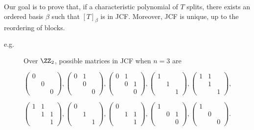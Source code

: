 \documentclass[11pt]{scrartcl}
\begin{document}
Our goal is to prove that, if a characteristic polynomial of $T$ splits, there exists an ordered basis $\beta$ such that $[T]_{\beta}$ is in JCF. Moreover, JCF is unique, up to the reordering of blocks.

\begin{description}

\item[e.g.] Over $\ZZ_2$, possible matrices in JCF when $n=3$ are

  $
  \begin{pmatrix}
    0 &   & \\
      & 0 & \\
      &   & 0
    \end{pmatrix},  \begin{pmatrix}
    0 &1   & \\
      & 0 & \\
      &   & 0
    \end{pmatrix},  \begin{pmatrix}
    0 & 1  & \\
      & 0 &1 \\
      &   & 0
    \end{pmatrix},
      \begin{pmatrix}
    1 &   & \\
      & 1 & \\
      &   & 1
    \end{pmatrix},  \begin{pmatrix}
    1 &1   & \\
      & 1 & \\
      &   & 1
    \end{pmatrix},$

    $  \begin{pmatrix}
    1 & 1  & \\
      & 1 &1 \\
      &   & 1 
    \end{pmatrix},
          \begin{pmatrix}
    0 &   & \\
      & 1 & \\
      &   & 1
    \end{pmatrix},  \begin{pmatrix}
    0 &    & \\
      & 1 & 1 \\
      &   & 1
    \end{pmatrix},
    \begin{pmatrix}
    1 &   & \\
      & 0 &1 \\
      &   & 0 
    \end{pmatrix},
    \begin{pmatrix}
    1 &   & \\
      & 0 & \\
      &   & 0 
    \end{pmatrix}
    $.
  \end{description}
\end{document}
